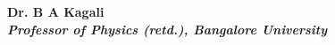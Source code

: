 \chapter{}\label{chap8}


\begin{center}
\textbf{Dr. B A Kagali}\\
\textbf{\textit{Professor of Physics (retd.), Bangalore University}}
\end{center}
